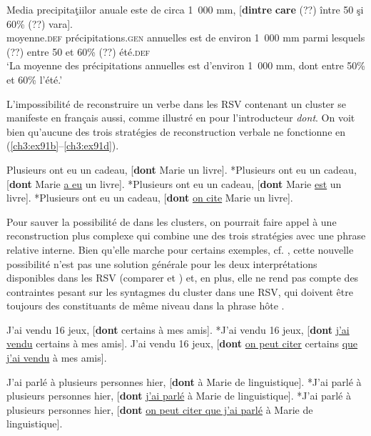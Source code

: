 \ea \label{ch3:ex90} 
\gll Media  precipitaţiilor  anuale  este  de  circa  1~000  mm,  [\textbf{dintre} \textbf{care}  (??)  între  50  şi  60\%  (??)  vara].\\
moyenne.\textsc{def}  précipitations.\textsc{gen}  annuelles  est  de  environ  1~000  mm  parmi lesquels  (??)  entre  50  et  60\%  (??)  été.\textsc{def} \\
\glt ‘La moyenne des précipitations annuelles est d’environ 1~000 mm, dont entre 50\% et 60\% l’été.’ 
\z

L’impossibilité de reconstruire un verbe dans les RSV contenant un cluster se manifeste en français aussi, comme illustré en  pour l’introducteur \textit{dont}. On voit bien qu’aucune des trois stratégies de reconstruction verbale ne fonctionne en (\ref{ch3:ex91b}--\ref{ch3:ex91d}).

\ea \label{ch3:ex91}
\ea 
Plusieurs ont eu un cadeau, [\textbf{dont} Marie un livre]. \label{ch3:ex91a} 
\ex
*Plusieurs ont eu un cadeau, [\textbf{dont} Marie \uline{a eu} un livre]. \label{ch3:ex91b}
\ex 
*Plusieurs ont eu un cadeau, [\textbf{dont} Marie \uline{est} un livre]. \label{ch3:ex91c}
\ex 
*Plusieurs ont eu un cadeau, [\textbf{dont} \uline{on cite} Marie un livre]. \label{ch3:ex91d}
\z 
\z 

Pour sauver la possibilité de  dans les clusters, on pourrait faire appel à une reconstruction plus complexe qui combine une des trois stratégies avec une phrase relative interne. Bien qu’elle marche pour certains exemples, cf. , cette nouvelle possibilité n’est pas une solution générale pour les deux interprétations disponibles dans les RSV (comparer  et ) et, en plus, elle ne rend pas compte des contraintes pesant sur les syntagmes du cluster dans une RSV, qui doivent être toujours des constituants de même niveau dans la phrase hôte .

\ea \label{ch3:ex92}
\ea 
J’ai vendu 16 jeux, [\textbf{dont} certains à mes amis]. \label{ch3:ex92a} 
\ex
*J’ai vendu 16 jeux, [\textbf{dont} \uline{j’ai vendu} certains à mes amis]. \label{ch3:ex92b}
\ex 
J’ai vendu 16 jeux, [\textbf{dont} \uline{on peut citer} certains \uline{que j’ai vendu} à mes amis]. \label{ch3:ex92c}
\z 
\z 

\ea \label{ch3:ex93} 
\ea 
J’ai parlé à plusieurs personnes hier, [\textbf{dont} à Marie de linguistique]. \label{ch3:ex93a} 
\ex
*J’ai parlé à plusieurs personnes hier, [\textbf{dont} \uline{j’ai parlé} à Marie de linguistique]. \label{ch3:ex93b}
\ex 
*J’ai parlé à plusieurs personnes hier, [\textbf{dont} \uline{on peut citer que j’ai parlé} à Marie de linguistique]. \label{ch3:ex93c}
\z 
\z

